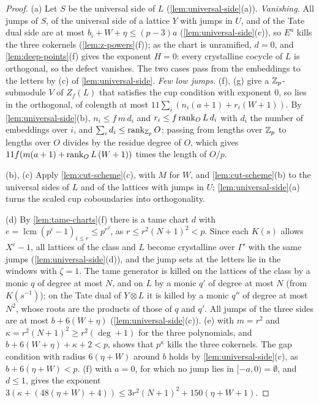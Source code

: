 \begin{proof}
(a) Let $S$ be the universal side of $L$ (\cref{lem:universal-side}(a)). \emph{Vanishing.} All jumps of $S$, of the universal side of a lattice $Y$ with jumps in $U$, and of the Tate dual side are at most $b_i+W+\eta\le(p-3)a$ (\cref{lem:universal-side}(c)), so $E^a$ kills the three cokernels (\cref{lem:z-powers}(f)); as the
chart is unramified, $d=0$, and \cref{lem:deep-points}(f) gives the exponent $H=0$: every crystalline cocycle of $L$ is orthogonal, so the defect vanishes. The two cases pass from the embeddings to the letters by (c) of \cref{lem:universal-side}. \emph{Few low jumps.} (f), (g) give a $\mathbb{Z}_p$-submodule $V$ of
$Z_f(L)$ that satisfies the cup condition with exponent $0$, so lies in the orthogonal, of colength at most $11\sum_i(n_i(a+1)+r_i(W+1))$. By \cref{lem:universal-side}(b), $n_i\le f\,m\,d_i$ and $r_i\le f\operatorname{rank}_OL\,d_i$ with $d_i$ the number of embeddings over $i$, and $\sum_id_i\le\operatorname{rank}_{\mathbb{Z}_p}O$; passing from lengths over $\mathbb{Z}_p$
to lengths over $O$ divides by the residue degree of $O$, which gives $11f(m(a+1)+\operatorname{rank}_OL\,(W+1))$ times the length of $O/p$.

(b), (c) Apply \cref{lem:cut-scheme}(c), with $M$ for $W$, and \cref{lem:cut-scheme}(b) to the universal sides of $L$ and of the lattices with jumps in $U$; \cref{lem:universal-side}(a) turns the scaled cup coboundaries into orthogonality.

(d) By \cref{lem:tame-charts}(f) there is a tame chart $d$ with $e=\operatorname{lcm}(p^i-1)_{i\le r}\le p^{r^2}$, as $r\le r^2(N+1)^2<p$. Since each $K(s)$ allows $X^e-1$, all lattices of the class and $L$ become crystalline over $\Gamma'$ with the same jumps (\cref{lem:universal-side}(d)), and the jump sets at the letters lie in the windows with $\zeta=1$.
The tame generator is killed on the lattices of the class by a monic $q$ of degree at most $N$, and on $L$ by a monic $q'$ of degree at most $N$ (from $K(s^{-1})$); on the Tate dual of $Y\otimes L$ it is killed by a monic $q''$ of degree at most $N^2$, whose roots are the products of those of $q$ and $q'$. All jumps of the three sides are at most
$b+6(W+\eta)$ (\cref{lem:universal-side}(c)). (e) with $m=r^2$ and $\kappa=r^2(N+1)^2\ge r^2(\deg+1)$ for the three polynomials, and $b+6(W+\eta)+\kappa+2<p$, shows that $p^\kappa$ kills the three cokernels. The gap condition with radius $6(\eta+W)$ around $b$ holds by \cref{lem:universal-side}(c), as
$b+6(\eta+W)<p$. (f) with $a=0$, for which no jump lies in $[-a,0)=\emptyset$, and $d\le1$, gives the exponent $3(\kappa+(48(\eta+W)+4))\le3r^2(N+1)^2+150(\eta+W+1)$.
\end{proof}
